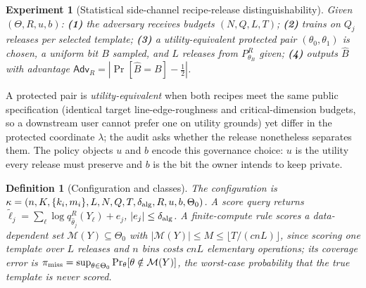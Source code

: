 \documentclass[11pt]{article}
\newtheorem{definition}{Definition}
\newtheorem{experiment}{Experiment}
\newcommand{\calM}{\mathcal M}
\newcommand{\Adv}{\mathsf{Adv}}
\begin{document}
\begin{experiment}[Statistical side-channel recipe-release distinguishability]
\label{exp:release}
Given \((\Theta,R,u,b)\): \textbf{(1)} the adversary receives budgets \((N,Q,L,T)\); \textbf{(2)} trains on \(Q_j\) releases per selected template; \textbf{(3)} a utility-equivalent protected pair \((\theta_0,\theta_1)\) is chosen, a uniform bit \(B\) sampled, and \(L\) releases from \(P_{\theta_B}^R\) given; \textbf{(4)} outputs \(\widehat B\) with advantage \(\Adv_R=|\Pr[\widehat B=B]-\tfrac12|\).
\end{experiment}

A protected pair is \emph{utility-equivalent} when both recipes meet the same public specification (identical target line-edge-roughness and critical-dimension budgets, so a downstream user cannot prefer one on utility grounds) yet differ in the protected coordinate \(\lambda\); the audit asks whether the release nonetheless separates them. The policy objects \(u\) and \(b\) encode this governance choice: \(u\) is the utility every release must preserve and \(b\) is the bit the owner intends to keep private.

\begin{definition}[Configuration and classes]
\label{def:classes}
The configuration is \(\kappa=(n,K,\{k_i,m_i\},L,N,Q,T,\delta_{\rm alg},R,u,b,\Theta_0)\). A score query returns \(\widetilde\ell_j=\sum_\ell\log q_{\widehat\theta_j}^R(Y_\ell)+e_j\), \(|e_j|\le\delta_{\rm alg}\). A finite-compute rule scores a data-dependent set \(\calM(Y)\subseteq\Theta_0\) with \(|\calM(Y)|\le M\le\lfloor T/(cnL)\rfloor\), since scoring one template over \(L\) releases and \(n\) bins costs \(cnL\) elementary operations; its coverage error is \(\pi_{\rm miss}=\sup_{\theta\in\Theta_0}\Pr_\theta[\theta\notin\calM(Y)]\), the worst-case probability that the true template is never scored.
\end{definition}
\end{document}
